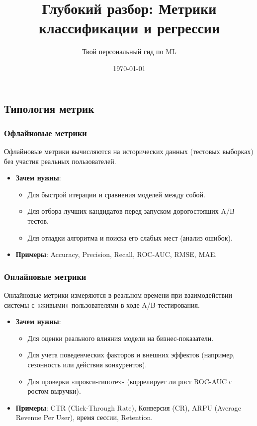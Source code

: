 \documentclass[12pt]{article}
\title{Глубокий разбор: Метрики классификации и регрессии}
\author{Твой персональный гид по ML}
\date{\today}
\begin{document}
\subsection{Типология метрик}

\subsubsection{Офлайновые метрики}
Офлайновые метрики вычисляются на исторических данных (тестовых выборках) без участия реальных пользователей.

\begin{itemize}
    \item \textbf{Зачем нужны}: 
    \begin{itemize}
        \item Для быстрой итерации и сравнения моделей между собой.
        \item Для отбора лучших кандидатов перед запуском дорогостоящих A/B-тестов.
        \item Для отладки алгоритма и поиска его слабых мест (анализ ошибок).
    \end{itemize}
    \item \textbf{Примеры}: Accuracy, Precision, Recall, ROC-AUC, RMSE, MAE.
\end{itemize}

\subsubsection{Онлайновые метрики}
Онлайновые метрики измеряются в реальном времени при взаимодействии системы с «живыми» пользователями в ходе A/B-тестирования.

\begin{itemize}
    \item \textbf{Зачем нужны}: 
    \begin{itemize}
        \item Для оценки реального влияния модели на бизнес-показатели.
        \item Для учета поведенческих факторов и внешних эффектов (например, сезонность или действия конкурентов).
        \item Для проверки «прокси-гипотез» (коррелирует ли рост ROC-AUC с ростом выручки).
    \end{itemize}
    \item \textbf{Примеры}: CTR (Click-Through Rate), Конверсия (CR), ARPU (Average Revenue Per User), время сессии, Retention.
\end{itemize}
\end{document}

